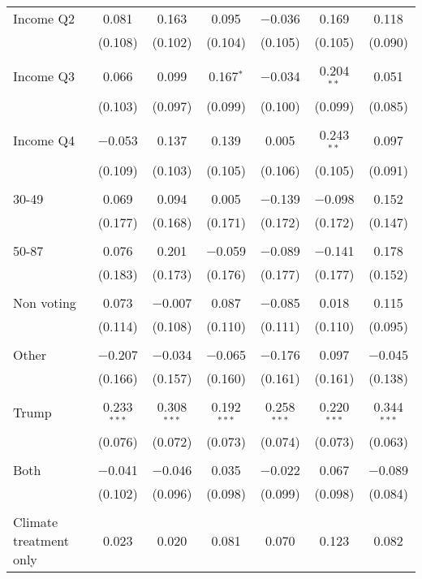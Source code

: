 \begin{tabular}{@{\extracolsep{5pt}}lcccccc}
 Income Q2 & 0.081 & 0.163 & 0.095 & $-$0.036 & 0.169 & 0.118 \\ 
  & (0.108) & (0.102) & (0.104) & (0.105) & (0.105) & (0.090) \\ 
  & & & & & & \\ 
 Income Q3 & 0.066 & 0.099 & 0.167$^{*}$ & $-$0.034 & 0.204$^{**}$ & 0.051 \\ 
  & (0.103) & (0.097) & (0.099) & (0.100) & (0.099) & (0.085) \\ 
  & & & & & & \\ 
 Income Q4 & $-$0.053 & 0.137 & 0.139 & 0.005 & 0.243$^{**}$ & 0.097 \\ 
  & (0.109) & (0.103) & (0.105) & (0.106) & (0.105) & (0.091) \\ 
  & & & & & & \\ 
 30-49 & 0.069 & 0.094 & 0.005 & $-$0.139 & $-$0.098 & 0.152 \\ 
  & (0.177) & (0.168) & (0.171) & (0.172) & (0.172) & (0.147) \\ 
  & & & & & & \\ 
 50-87 & 0.076 & 0.201 & $-$0.059 & $-$0.089 & $-$0.141 & 0.178 \\ 
  & (0.183) & (0.173) & (0.176) & (0.177) & (0.177) & (0.152) \\ 
  & & & & & & \\ 
 Non voting & 0.073 & $-$0.007 & 0.087 & $-$0.085 & 0.018 & 0.115 \\ 
  & (0.114) & (0.108) & (0.110) & (0.111) & (0.110) & (0.095) \\ 
  & & & & & & \\ 
 Other & $-$0.207 & $-$0.034 & $-$0.065 & $-$0.176 & 0.097 & $-$0.045 \\ 
  & (0.166) & (0.157) & (0.160) & (0.161) & (0.161) & (0.138) \\ 
  & & & & & & \\ 
 Trump & 0.233$^{***}$ & 0.308$^{***}$ & 0.192$^{***}$ & 0.258$^{***}$ & 0.220$^{***}$ & 0.344$^{***}$ \\ 
  & (0.076) & (0.072) & (0.073) & (0.074) & (0.073) & (0.063) \\ 
  & & & & & & \\ 
 Both & $-$0.041 & $-$0.046 & 0.035 & $-$0.022 & 0.067 & $-$0.089 \\ 
  & (0.102) & (0.096) & (0.098) & (0.099) & (0.098) & (0.084) \\ 
  & & & & & & \\ 
 Climate treatment only & 0.023 & 0.020 & 0.081 & 0.070 & 0.123 & 0.082 \\ 

\end{tabular}
